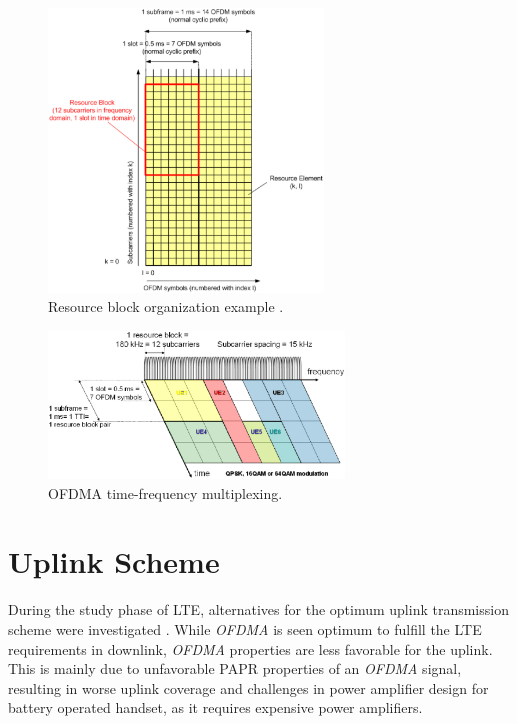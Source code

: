 \begin{figure}[htbp]
    \centering
    \includegraphics[width=0.65\textwidth]{./figures/ofdm_resource_block}
    \caption{ Resource block organization example \cite{umtslte}.
    \label{fig:ofdmresblk}}
\end{figure}

\begin{figure}[htbp]
    \centering
    \includegraphics[width=0.70\textwidth]{./figures/downlink_channels}
    \caption{ OFDMA time-frequency multiplexing.
    \label{fig:dlchann}}
\end{figure}


\section{Uplink Scheme}%

During the study phase of LTE, alternatives for the optimum uplink transmission
scheme were investigated \cite{umtslte}. While \textit{OFDMA} is seen optimum to
fulfill the LTE requirements in downlink, \textit{OFDMA} properties are less
favorable for the uplink. This is mainly due to unfavorable PAPR properties of
an \textit{OFDMA} signal, resulting in worse uplink coverage and challenges in
power amplifier design for battery operated handset, as it requires expensive
power amplifiers.

